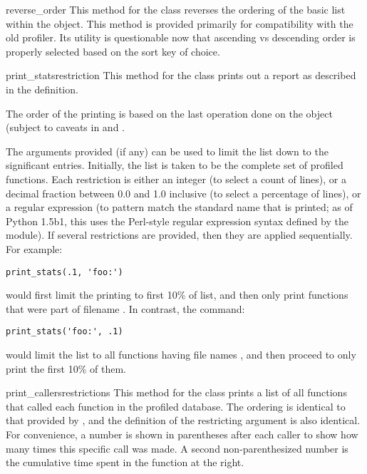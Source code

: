 \begin{methoddesc}[Stats]{reverse_order}{}
This method for the  class reverses the ordering of the basic
list within the object.  This method is provided primarily for
compatibility with the old profiler.  Its utility is questionable
now that ascending vs descending order is properly selected based on
the sort key of choice.
\end{methoddesc}

\begin{methoddesc}[Stats]{print_stats}{restriction}
This method for the  class prints out a report as described
in the  definition.

The order of the printing is based on the last 
operation done on the object (subject to caveats in  and
.

The arguments provided (if any) can be used to limit the list down to
the significant entries.  Initially, the list is taken to be the
complete set of profiled functions.  Each restriction is either an
integer (to select a count of lines), or a decimal fraction between
0.0 and 1.0 inclusive (to select a percentage of lines), or a regular
expression (to pattern match the standard name that is printed; as of
Python 1.5b1, this uses the Perl-style regular expression syntax
defined by the  module).  If several restrictions are
provided, then they are applied sequentially.  For example:

\begin{verbatim}
print_stats(.1, 'foo:')
\end{verbatim}

would first limit the printing to first 10\% of list, and then only
print functions that were part of filename .  In
contrast, the command:

\begin{verbatim}
print_stats('foo:', .1)
\end{verbatim}

would limit the list to all functions having file names ,
and then proceed to only print the first 10\% of them.
\end{methoddesc}


\begin{methoddesc}[Stats]{print_callers}{restrictions}
This method for the  class prints a list of all functions
that called each function in the profiled database.  The ordering is
identical to that provided by , and the definition
of the restricting argument is also identical.  For convenience, a
number is shown in parentheses after each caller to show how many
times this specific call was made.  A second non-parenthesized number
is the cumulative time spent in the function at the right.
\end{methoddesc}

